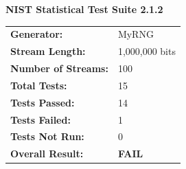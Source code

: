 \documentclass{article}
\begin{document}
\begin{center}
\LARGE\textbf{NIST Statistical Test Suite 2.1.2}
\end{center}

\begin{center}
\begin{tabular}{ll}
\toprule
\textbf{Generator:} & MyRNG \\
\textbf{Stream Length:} & 1,000,000 bits \\
\textbf{Number of Streams:} & 100 \\
\textbf{Total Tests:} & 15 \\
\textbf{Tests Passed:} & 14 \\
\textbf{Tests Failed:} & 1 \\
\textbf{Tests Not Run:} & 0 \\
\midrule
\textbf{\textcolor{failred}{Overall Result:}} & \textcolor{failred}{\textbf{FAIL}} \\
\bottomrule
\end{tabular}
\end{center}
\end{document}
